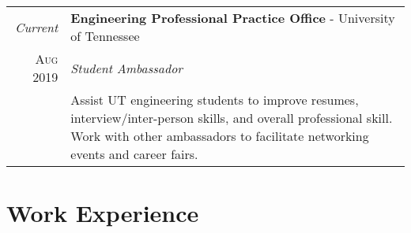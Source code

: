 \documentclass[a4paper,11pt]{article}
\begin{document}
\begin{tabularx}{\textwidth}{r|X}

   \emph{Current} & \textbf{Engineering Professional Practice Office} \-- University of Tennessee\\
   \textsc{Aug 2019} & \emph{Student Ambassador}\\
   & \small{Assist UT engineering students to improve resumes, interview/inter-person skills, and overall professional skill.
            Work with other ambassadors to facilitate networking events and career fairs.
   }\\


\end{tabularx}

\section{Work Experience}
\end{document}

